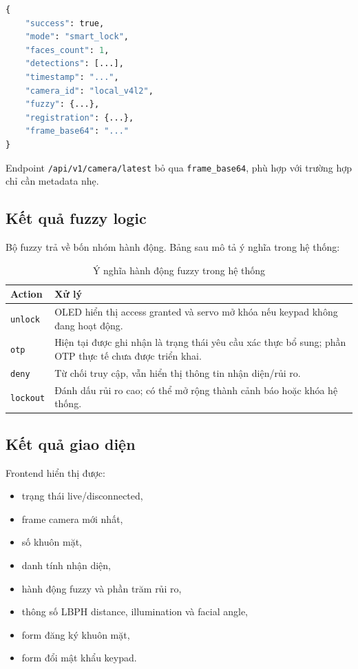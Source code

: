 \begin{lstlisting}[language=Python, caption={Các trường chính trong response camera}]
{
    "success": true,
    "mode": "smart_lock",
    "faces_count": 1,
    "detections": [...],
    "timestamp": "...",
    "camera_id": "local_v4l2",
    "fuzzy": {...},
    "registration": {...},
    "frame_base64": "..."
}
\end{lstlisting}

Endpoint \texttt{/api/v1/camera/latest} bỏ qua \texttt{frame\_base64}, phù hợp với trường hợp chỉ cần metadata nhẹ.

\subsection{Kết quả fuzzy logic}

Bộ fuzzy trả về bốn nhóm hành động. Bảng sau mô tả ý nghĩa trong hệ thống:

\begin{table}[H]
\centering
\caption{Ý nghĩa hành động fuzzy trong hệ thống}
\label{tab:fuzzy_action_result}
\begin{tabularx}{\textwidth}{|l|X|}
\hline
\textbf{Action} & \textbf{Xử lý} \\
\hline
\texttt{unlock} & OLED hiển thị access granted và servo mở khóa nếu keypad không đang hoạt động. \\
\hline
\texttt{otp} & Hiện tại được ghi nhận là trạng thái yêu cầu xác thực bổ sung; phần OTP thực tế chưa được triển khai. \\
\hline
\texttt{deny} & Từ chối truy cập, vẫn hiển thị thông tin nhận diện/rủi ro. \\
\hline
\texttt{lockout} & Đánh dấu rủi ro cao; có thể mở rộng thành cảnh báo hoặc khóa hệ thống. \\
\hline
\end{tabularx}
\end{table}

\subsection{Kết quả giao diện}

Frontend hiển thị được:

\begin{itemize}
    \item trạng thái live/disconnected,
    \item frame camera mới nhất,
    \item số khuôn mặt,
    \item danh tính nhận diện,
    \item hành động fuzzy và phần trăm rủi ro,
    \item thông số LBPH distance, illumination và facial angle,
    \item form đăng ký khuôn mặt,
    \item form đổi mật khẩu keypad.
\end{itemize}

